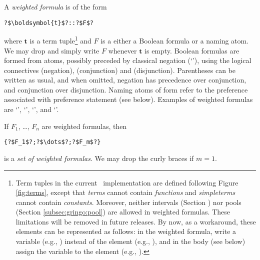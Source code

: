 A \emph{weighted formula} is of the form
\begin{lstlisting}[numbers=none,escapechar=?]
?$\boldsymbol{t}$?::?$F$?
\end{lstlisting}
where $\boldsymbol{t}$ is a term tuple\footnote{%
Term tuples in the current \asprin\ implementation are defined following Figure \ref{fig:terms}, 
except that \emph{terms} cannot contain \emph{functions} 
and \emph{simpleterms} cannot contain \emph{constants}. 
Moreover, neither intervals (Section \label{subsec:gringo:interval}) nor pools  (Section \ref{subsec:gringo:pool})
are allowed in weighted formulas. 
These limitations will be removed in future releases. 
By now, as a workaround, these elements can be represented as follows:
in the weighted formula, write a variable (e.g., ) instead of the element (e.g., ),  
and in the body (see below) assign the variable to the element (e.g., ).
}
and $F$ is a either a Boolean formula or a naming atom.
We may drop \code{::} and simply write $F$ whenever $\boldsymbol{t}$ is empty.
Boolean formulas are formed from atoms, possibly preceded by classical negation (`\code{-}'),
using the logical connectives \code{\~} (negation), \code{\&} (conjunction) and \code{|} (disjunction).
Parentheses can be written as usual,
and when omitted, negation has precedence over conjunction, and conjunction over disjunction.
%
Naming atoms of form 
refer to the preference associated with preference statement  (see below).
%
Examples of weighted formulas are 
`', 
`', 
`', and 
`'. 

If $F_1$, \ldots, $F_n$ are weighted formulas, then
\begin{lstlisting}[numbers=none,escapechar=?]
{?$F_1$?;?$\dots$?;?$F_m$?}
\end{lstlisting}
is a \emph{set of weighted formulas}.  
We may drop the curly braces if $m=1$.

